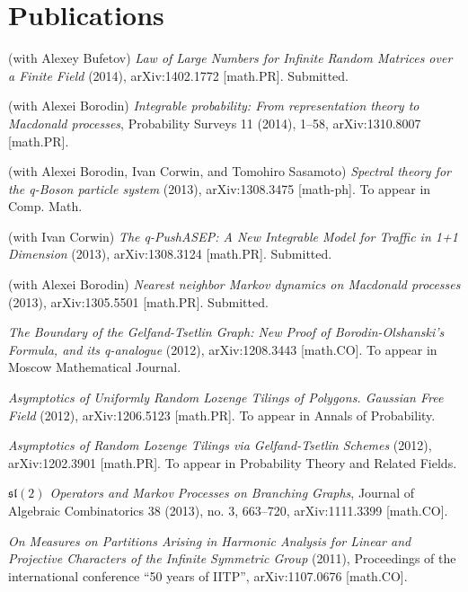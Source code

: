 \documentclass[letterpaper,11pt]{article}
\begin{document}
\section*{Publications}

\begin{etaremune}
    \renewcommand{\labelenumi}{[\theenumi]}
    \item (with Alexey Bufetov)
    \emph{Law of Large Numbers for Infinite Random Matrices over a Finite Field} (2014), arXiv:1402.1772 [math.PR].
    Submitted.
    \item (with Alexei Borodin) 
    \emph{Integrable probability: From representation theory to Macdonald processes}, 
    Probability Surveys 11 (2014), 1--58, arXiv:1310.8007 [math.PR]. 
    \item (with Alexei Borodin, Ivan Corwin, and Tomohiro Sasamoto)
    \emph{Spectral theory for the q-Boson particle system}
    (2013), arXiv:1308.3475 [math-ph]. To appear in Comp. Math.
    \item (with Ivan Corwin)
    \emph{The q-PushASEP: A New Integrable Model for Traffic in 1+1 Dimension} (2013), arXiv:1308.3124 [math.PR]. 
    Submitted.
    \item (with Alexei Borodin) 
    \emph{Nearest neighbor Markov dynamics on Macdonald processes} (2013), 
    arXiv:1305.5501 [math.PR].
    Submitted.
    \item \emph{The Boundary of the Gelfand-Tsetlin Graph: New Proof of Borodin-Olshanski's Formula, and its q-analogue} (2012),  arXiv:1208.3443 [math.CO]. To appear in Moscow Mathematical Journal.
    \item \emph{Asymptotics of Uniformly Random Lozenge Tilings of Polygons. Gaussian Free Field} (2012), arXiv:1206.5123 [math.PR]. To appear in Annals of Probability.
    \item \emph{Asymptotics of Random Lozenge Tilings via Gelfand-Tsetlin Schemes} (2012), arXiv:1202.3901 [math.PR]. To
    appear in Probability Theory and Related Fields.
    \item \emph{$\mathfrak{sl}(2)$ Operators and Markov Processes on Branching Graphs},
    Journal of Algebraic Combinatorics 38 (2013), no. 3, 663--720,
    arXiv:1111.3399 [math.CO].
    \item \emph{On Measures on Partitions Arising in Harmonic Analysis for Linear and Projective Characters of the Infinite Symmetric Group} (2011), Proceedings of the international conference ``50 years of IITP'', arXiv:1107.0676 [math.CO].

\end{etaremune}
\end{document}
